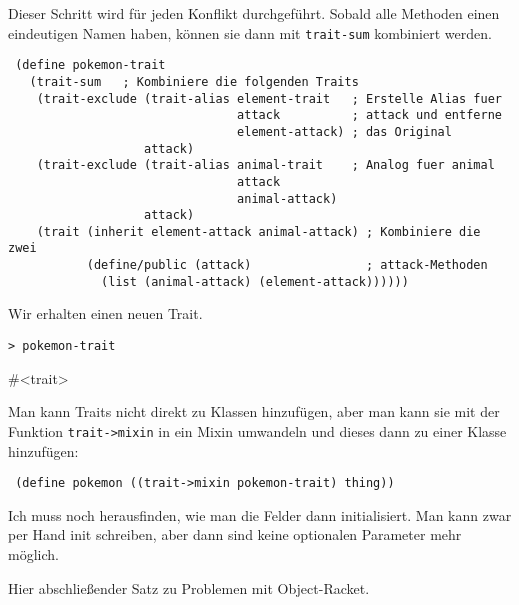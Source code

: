 Dieser Schritt wird für jeden Konflikt durchgeführt. Sobald alle Methoden einen eindeutigen Namen haben, können sie dann mit \texttt{trait-sum} kombiniert werden.

\begin{lstlisting}
 (define pokemon-trait
   (trait-sum   ; Kombiniere die folgenden Traits
    (trait-exclude (trait-alias element-trait   ; Erstelle Alias fuer
                                attack          ; attack und entferne
                                element-attack) ; das Original
                   attack)
    (trait-exclude (trait-alias animal-trait    ; Analog fuer animal
                                attack         
                                animal-attack)
                   attack)
    (trait (inherit element-attack animal-attack) ; Kombiniere die zwei
           (define/public (attack)                ; attack-Methoden
             (list (animal-attack) (element-attack))))))
\end{lstlisting}

Wir erhalten einen neuen Trait. 

\begin{lstlisting}
> pokemon-trait
\end{lstlisting}
{\routput \#<trait>}

Man kann Traits nicht direkt zu Klassen hinzufügen, aber man kann sie mit der Funktion \texttt{trait->mixin} in ein Mixin umwandeln und dieses dann zu einer Klasse hinzufügen:

\begin{lstlisting}
 (define pokemon ((trait->mixin pokemon-trait) thing))
\end{lstlisting}

Ich muss noch herausfinden, wie man die Felder dann initialisiert. Man kann zwar per Hand init schreiben, aber dann sind keine optionalen Parameter mehr möglich. %

Hier abschließender Satz zu Problemen mit Object-Racket. %